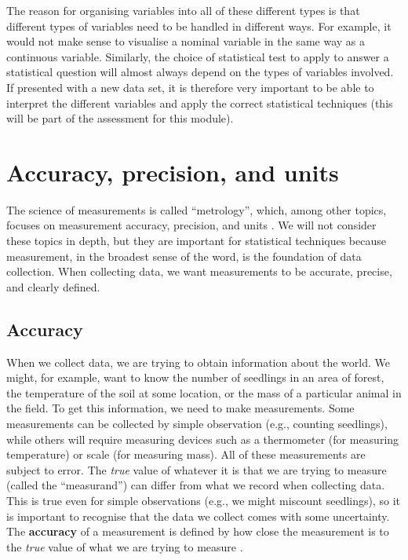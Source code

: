 \documentclass[
]{scrbook}
\begin{document}
The reason for organising variables into all of these different types is that different types of variables need to be handled in different ways.
For example, it would not make sense to visualise a nominal variable in the same way as a continuous variable.
Similarly, the choice of statistical test to apply to answer a statistical question will almost always depend on the types of variables involved.
If presented with a new data set, it is therefore very important to be able to interpret the different variables and apply the correct statistical techniques (this will be part of the assessment for this module).

\hypertarget{Chapter_6}{%
\chapter{Accuracy, precision, and units}\label{Chapter_6}}

The science of measurements is called ``metrology'', which, among other topics, focuses on measurement accuracy, precision, and units \citep{Rabinovich2013}.
We will not consider these topics in depth, but they are important for statistical techniques because measurement, in the broadest sense of the word, is the foundation of data collection.
When collecting data, we want measurements to be accurate, precise, and clearly defined.

\hypertarget{accuracy}{%
\section{Accuracy}\label{accuracy}}

When we collect data, we are trying to obtain information about the world.
We might, for example, want to know the number of seedlings in an area of forest, the temperature of the soil at some location, or the mass of a particular animal in the field.
To get this information, we need to make measurements.
Some measurements can be collected by simple observation (e.g., counting seedlings), while others will require measuring devices such as a thermometer (for measuring temperature) or scale (for measuring mass).
All of these measurements are subject to error.
The \emph{true} value of whatever it is that we are trying to measure (called the ``measurand'') can differ from what we record when collecting data.
This is true even for simple observations (e.g., we might miscount seedlings), so it is important to recognise that the data we collect comes with some uncertainty.
The \textbf{accuracy} of a measurement is defined by how close the measurement is to the \emph{true} value of what we are trying to measure \citep{Rabinovich2013}.
\end{document}
